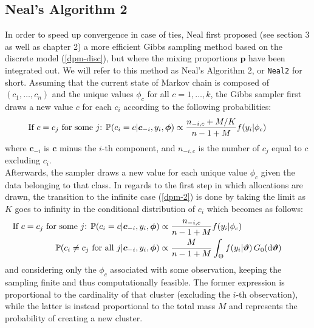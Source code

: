 \subsection{Neal's Algorithm 2} \label{neal2} %
In order to speed up convergence in case of ties, Neal first proposed (see \cite{neal} section 3 as well as \cite{book} chapter 2) a more efficient Gibbs sampling method based on the discrete model (\ref{dpm-disc}), but where the mixing proportions $\textbf{p}$ have been integrated out.
We will refer to this method as Neal's Algorithm 2, or \verb|Neal2| for short.
Assuming that the current state of Markov chain is composed of $(c_1,\dots,c_n)$  and the unique values $\phi_c$ for all $c=1,\dots,k$, the Gibbs sampler first draws a new value $c$ for each $c_i$ according to the following probabilities:
\begin{align}
	\hspace{-25pt}
	\vspace{-12pt}
	\text{If $c=c_j$ for some $j$: }
	\PP(c_{i}=c | \boldsymbol c_{-i}, y_{i},\boldsymbol\phi) \propto \frac{n_{-i,c} + M/{K}}{n-1+M} f(y_{i}|\phi_{c}) 
\end{align}
where $\boldsymbol c_{-i}$ is $\boldsymbol c$ minus the $i$-th component, and $n_{-i,c}$ is the number of $c_j$ equal to $c$ excluding $c_i$. \\
Afterwards, the sampler draws a new value for each unique value $\phi_c$ given the data belonging to that class. 
In regards to the first step in which allocations are drawn, the transition to the infinite case (\ref{dpm-2}) is done by taking the limit as $K$ goes to infinity in the conditional distribution of $c_i$ which becomes as follows:
\begin{equation}
	\begin{aligned} \label{probasneal2}
	\hspace{-25pt}
	\vspace{-12pt}
	\text{If $c=c_j$ for some $j$: }
	\PP(c_{i}=c | \boldsymbol c_{-i}, y_{i},\boldsymbol\phi) &\propto \frac{n_{-i,c} }{n-1+M} f(y_{i}|\phi_{c}) \\
	\PP(c_{i}\neq c_{j} \text{ for all } j | \boldsymbol c_{-i}, y_{i},\boldsymbol\phi) &\propto \frac{M }{n-1+M} \int_{\Theta} f(y_{i}|\boldsymbol\theta) \, G_0(\de\boldsymbol\theta)
	\end{aligned}
\end{equation}
and considering only the $\phi_c$ associated with some observation, keeping the sampling finite and thus computationally feasible.
The former expression is proportional to the cardinality of that cluster (excluding the $i$-th observation), while the latter is instead proportional to the total mass $M$ and represents the probability of creating a new cluster. \\
